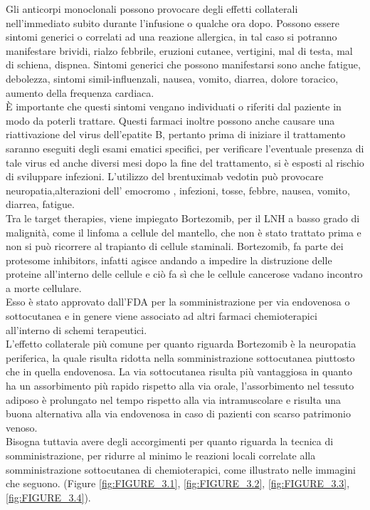 Gli anticorpi monoclonali possono provocare degli effetti collaterali nell’immediato subito durante l’infusione o 
qualche ora dopo. 
Possono essere sintomi generici o correlati ad una reazione allergica, in tal caso si potranno manifestare brividi, 
rialzo febbrile, eruzioni cutanee, vertigini, mal di testa, mal di schiena, dispnea. 
Sintomi generici che possono manifestarsi sono anche  fatigue, debolezza, sintomi simil-influenzali, nausea, vomito, 
diarrea, dolore toracico, aumento della frequenza cardiaca\cite{LLSIMMUNO}.\\
È importante che questi sintomi vengano individuati o riferiti dal paziente in modo da poterli trattare.		
Questi farmaci inoltre possono anche causare una riattivazione del virus dell’epatite B, pertanto prima di iniziare 
il trattamento saranno eseguiti degli esami ematici specifici, per verificare l’eventuale presenza di tale virus ed 
anche diversi mesi dopo la fine del trattamento, si è esposti al rischio di sviluppare infezioni. 
L’utilizzo del brentuximab vedotin può provocare neuropatia,alterazioni  dell’ emocromo , infezioni, tosse, febbre, 
nausea, vomito, diarrea, fatigue\cite{IMMUNOTP}.\\

Tra le target therapies, viene impiegato Bortezomib, per il LNH a basso grado di malignità, come il linfoma a cellule del 
mantello, che non è stato trattato prima e non si può ricorrere al trapianto di cellule staminali.
Bortezomib, fa parte dei protesome inhibitors, infatti agisce andando a impedire la distruzione 
delle proteine all’interno delle cellule e ciò fa sì che le cellule cancerose vadano incontro a 
morte cellulare\cite{LOWGRADE}.\\
Esso è stato approvato dall’FDA per la somministrazione per via endovenosa o sottocutanea e in genere viene associato 
ad altri farmaci chemioterapici all’interno di schemi terapeutici.\\ L’effetto collaterale più comune per quanto 
riguarda Bortezomib è la neuropatia periferica, la quale risulta ridotta nella somministrazione sottocutanea piuttosto 
che in quella endovenosa. La via sottocutanea risulta più vantaggiosa in quanto ha un assorbimento più rapido rispetto 
alla via orale, l’assorbimento nel tessuto adiposo è prolungato nel tempo rispetto alla via intramuscolare e 
risulta una buona alternativa alla via endovenosa in caso di pazienti con scarso patrimonio venoso\cite{BORTEZOMIB}.\\
Bisogna tuttavia avere degli accorgimenti per quanto riguarda la tecnica di somministrazione, per ridurre al minimo 
le reazioni locali correlate alla somministrazione sottocutanea di chemioterapici, 
come illustrato nelle immagini che seguono.
(Figure \ref{fig:FIGURE_3.1}, \ref{fig:FIGURE_3.2}, \ref{fig:FIGURE_3.3}, \ref{fig:FIGURE_3.4}).\\


